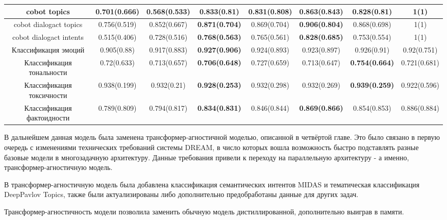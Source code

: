 \begin{table}[htbp]
{\begin{tabular}{|c||c|c|c|c|c|c|c|}
\hline
\hline
cobot topics & \textbf{0.701(0.666)} & 0.568(0.533) & 0.833(0.81) & 0.831(0.808) & \textbf{0.863(0.843)} & 0.828(0.81) & 1(1) \\
\hline
cobot dialogact topics & 0.756(0.519) & 0.852(0.667) & \textbf{0.871(0.704)} & 0.869(0.704) & \textbf{0.906(0.804)} & 0.868(0.698) & 1(1) \\
\hline
cobot dialogact intents & 0.515(0.406) & 0.728(0.516) & \textbf{0.768(0.563)} & 0.765(0.561) & \textbf{0.828(0.685)} & 0.753(0.554) & 1(1) \\
\hline
Классификация эмоций & 0.905(0.88) & 0.917(0.883) & \textbf{0.927(0.906)} & 0.924(0.893) & 0.923(0.897) & 0.926(0.91) & 0.92(0.751) \\
\hline
Классификация тональности & 0.72(0.633) & 0.713(0.657) & \textbf{0.706(0.648)} & 0.727(0.659) & 0.713(0.647) & \textbf{0.754(0.664)} & 0.721(0.681) \\
\hline
Классификация токсичности & 0.938(0.199) & 0.932(0.21) & \textbf{0.928(0.253)} & 0.932(0.298) & 0.932(0.269) & \textbf{0.939(0.259)} & 0.922(0.596) \\
\hline
Классификация фактоидности & 0.789(0.809) & 0.794(0.817) & \textbf{0.834(0.831)} & 0.846(0.844) & \textbf{0.869(0.866)} & 0.854(0.853) & 0.886(0.884) \\
\hline
\end{tabular}
}
\end{table}


В дальнейшем данная модель была заменена трансформер-агностичной моделью, описанной в четвёртой главе. Это было связано в первую очередь с изменениями технических требований системы DREAM, в число которых вошла возможность быстро подставлять разные базовые модели в многозадачную архитектуру. Данные требования привели к переходу на параллельную архитектуру - а именно, трансформер-агностичную модель.


В трансформер-агностичную модель была добавлена классификация семантических интентов MIDAS и тематическая классификация DeepPavlov Topics, также были актуализированы либо дополнительно предобработаны данные для других задач. 

Трансформер-агностичность модели позволила заменить обычную модель дистиллированной, дополнительно выиграв в памяти.

